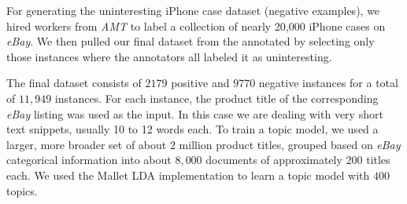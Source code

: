 For generating the uninteresting iPhone case dataset (negative examples), we
hired workers from {\em AMT} to label a collection
of nearly 20,000 iPhone cases on {\em eBay}.  We then pulled our final dataset from the annotated by selecting only those instances where the annotators all labeled it as uninteresting. 

The final dataset consists of $2179$ positive and $9770$ negative instances
for a total of $11,949$ instances. For each instance, the product title of
the corresponding {\em eBay} listing was used as the input. In this case we are
dealing with very short text snippets, usually 10 to 12 words each. To
train a topic model, we used a larger, more broader set of about
$2$ million product titles, grouped based on {\em eBay} categorical information into about $8,000$
documents of approximately $200$ titles each. We used the Mallet LDA
implementation to learn a topic model with $400$ topics.



